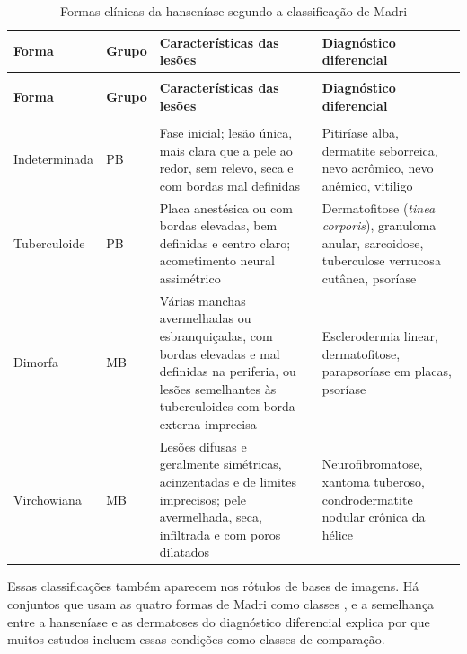 \begingroup
\begin{longtable}{|>{\footnotesize\raggedright\arraybackslash}p{2.2cm}|>{\footnotesize\raggedright\arraybackslash}p{0.9cm}|>{\footnotesize\raggedright\arraybackslash}p{4.8cm}|>{\footnotesize\raggedright\arraybackslash}p{4.2cm}|}
	\caption{Formas clínicas da hanseníase segundo a classificação de Madri}\label{tab:formas-hanseniase} \\
	\hline
	\textbf{Forma} & \textbf{Grupo} & \textbf{Características das lesões} & \textbf{Diagnóstico diferencial} \\ \hline
	\endfirsthead
	\multicolumn{4}{l}{\footnotesize\textit{Tabela~\ref{tab:formas-hanseniase} (continuação)}} \\
	\hline
	\textbf{Forma} & \textbf{Grupo} & \textbf{Características das lesões} & \textbf{Diagnóstico diferencial} \\ \hline
	\endhead
	\multicolumn{4}{r}{\footnotesize\textit{continua na próxima página}} \\
	\endfoot
	\endlastfoot
	Indeterminada & PB & Fase inicial; lesão única, mais clara que a pele ao redor, sem relevo, seca e com bordas mal definidas & Pitiríase alba, dermatite seborreica, nevo acrômico, nevo anêmico, vitiligo \\ \hline
		Tuberculoide & PB & Placa anestésica ou com bordas elevadas, bem definidas e centro claro; acometimento neural assimétrico & Dermatofitose (\textit{tinea corporis}), granuloma anular, sarcoidose, tuberculose verrucosa cutânea, psoríase \\ \hline
		Dimorfa & MB & Várias manchas avermelhadas ou esbranquiçadas, com bordas elevadas e mal definidas na periferia, ou lesões semelhantes às tuberculoides com borda externa imprecisa & Esclerodermia linear, dermatofitose, parapsoríase em placas, psoríase \\ \hline
		Virchowiana & MB & Lesões difusas e geralmente simétricas, acinzentadas e de limites imprecisos; pele avermelhada, seca, infiltrada e com poros dilatados & Neurofibromatose, xantoma tuberoso, condrodermatite nodular crônica da hélice \\ \hline
\end{longtable}
\endgroup
{}

Essas classificações também aparecem nos rótulos de bases de imagens. Há
conjuntos que usam as quatro formas de Madri como classes
\cite{lima2024skin}, e a semelhança entre a hanseníase e as dermatoses do
diagnóstico diferencial explica por que muitos estudos incluem essas
condições como classes de comparação.

